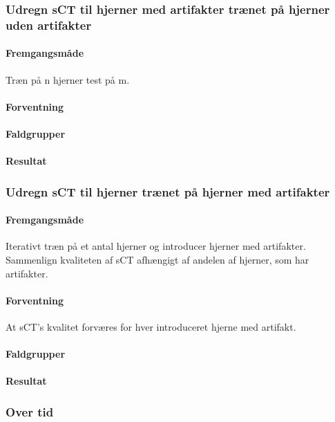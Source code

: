 \subsubsection{Udregn sCT til hjerner med artifakter trænet på hjerner uden artifakter}
\paragraph{Fremgangsmåde}
Træn på n hjerner test på m.

\paragraph{Forventning}

\paragraph{Faldgrupper}

\paragraph{Resultat}

\subsubsection{Udregn sCT til hjerner trænet på hjerner med artifakter}
\paragraph{Fremgangsmåde}
Iterativt træn på et antal hjerner og introducer hjerner med artifakter.
Sammenlign kvaliteten af sCT afhængigt af andelen af hjerner, som har
artifakter.

\paragraph{Forventning}
At sCT's kvalitet forværes for hver introduceret hjerne med artifakt.

\paragraph{Faldgrupper}

\paragraph{Resultat}


\subsubsection{Over tid}
